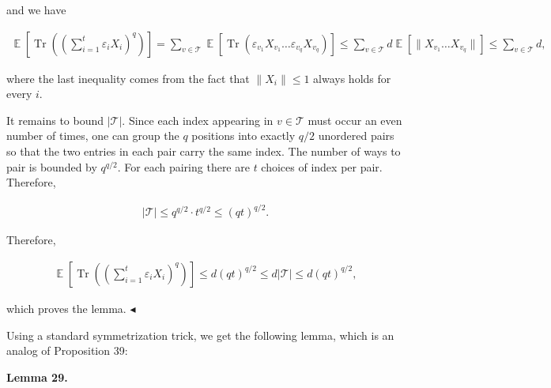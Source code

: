 and we have\par


\[\begin{gathered}
\operatorname*{\mathbb{E}}\left[\operatorname*{Tr}\left(\left(\sum_{i=1}^{t}\varepsilon_{i}X_{i}\right)^{q}\right)\right]=\sum_{v\in\mathcal{T}}\operatorname*{\mathbb{E}}\left[\operatorname*{Tr}(\varepsilon_{v_{1}}X_{v_{1}}\dots\varepsilon_{v_{q}}X_{v_{q}})\right]\leq\sum_{v\in\mathcal{T}}d\operatorname*{\mathbb{E}}\left[\|X_{v_{1}}\dots X_{v_{q}}\|\right]\leq\sum_{v\in\mathcal{T}}d,
\end{gathered}\]


where the last inequality comes from the fact that $\|X_{i}\|\leq 1$ always holds for every $i$.\par




It remains to bound $|\mathcal{T}|$.
Since each index appearing in $v\in\mathcal{T}$ must occur an even number of times, one can group the $q$ positions into exactly $q/2$ unordered pairs so that the two entries in each pair carry the same index.
The number of ways to pair is bounded by $q^{q/2}$.
For each pairing there are $t$ choices of index per pair. Therefore,\par


\[\begin{gathered}
|\mathcal{T}|\leq q^{q/2}\cdot t^{q/2}\leq(qt)^{q/2}.
\end{gathered}\]




Therefore,\par


\[\begin{gathered}
\operatorname*{\mathbb{E}}\left[\operatorname*{Tr}\left(\left(\sum_{i=1}^{t}\varepsilon_{i}X_{i}\right)^{q}\right)\right]\leq d(qt)^{q/2}\leq d|\mathcal{T}|\leq d(qt)^{q/2},
\end{gathered}\]


which proves the lemma.
$\blacktriangleleft$\par




Using a standard symmetrization trick, we get the following lemma, which is an analog of Proposition 39:\par





\par\medskip\noindent\textbf{
\textbf{Lemma 29}\textbf{.}
}\par



